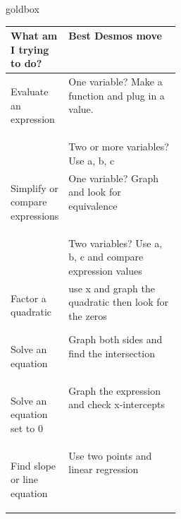 \documentclass[14pt]{article}
\begin{document}
        \begin{skillbox}{goldbox}
            \begin{tabularx}{\linewidth}{>{\bfseries}p{0.28\linewidth}X}
            What am I trying to do? & Best Desmos move \\
            \hline
            \vspace{0.5em}

            Evaluate an expression & \vspace{0.5em} One variable? Make a function and plug in a value.  \\
            & Two or more variables?  Use a, b, c \\
            \hline
            \vspace{0.5em}

            Simplify or compare expressions & \vspace{0.5em} One variable? Graph and look for equivalence\\
            & Two variables? Use a, b, c and compare expression values\\
            \hline
            \vspace{0.5em}

            Factor a quadratic & \vspace{0.5em}use x and graph the quadratic then look for the zeros \\
            \hline
            \vspace{0.5em}

            Solve an equation & \vspace{0.5em} Graph both sides and find the intersection \\
            \hline
            \vspace{0.5em}

            Solve an equation set to 0 & \vspace{0.5em} Graph the expression and check x-intercepts \\
            \hline
            \vspace{0.5em}

            Find slope or line equation & \vspace{0.5em} Use two points and linear regression \\
            \end{tabularx}
        \end{skillbox}
\end{document}
